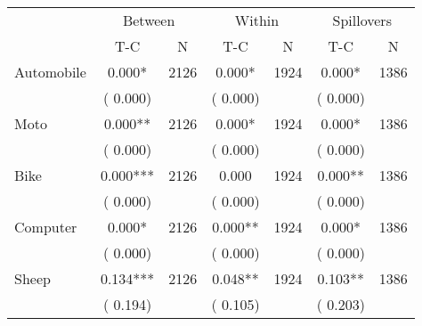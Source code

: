 
\begin{tabular}{l*{6}{c}}\hline&\multicolumn{2}{c}{Between}&\multicolumn{2}{c}{Within}&\multicolumn{2}{c}{Spillovers} \\ \cmidrule(r){2-3}\cmidrule(l){4-5}\cmidrule(l){6-7} & {T-C} & {N} & {T-C} & {N}  & {T-C}  & {N}  \\ \midrule
Automobile        &              0.000*      &       2126       &              0.000*      &       1924       &              0.000*      &       1386       \\
                       &       (       0.000)            &                               &       (       0.000)            &                               &       (       0.000)            &                               \\
Moto        &              0.000**      &       2126       &              0.000*      &       1924       &              0.000*      &       1386       \\
                       &       (       0.000)            &                               &       (       0.000)            &                               &       (       0.000)            &                               \\
Bike        &              0.000***      &       2126       &              0.000      &       1924       &              0.000**      &       1386       \\
                       &       (       0.000)            &                               &       (       0.000)            &                               &       (       0.000)            &                               \\
Computer        &              0.000*      &       2126       &              0.000**      &       1924       &              0.000*      &       1386       \\
                       &       (       0.000)            &                               &       (       0.000)            &                               &       (       0.000)            &                               \\
Sheep        &              0.134***      &       2126       &              0.048**      &       1924       &              0.103**      &       1386       \\
                       &       (       0.194)            &                               &       (       0.105)            &                               &       (       0.203)            &                               \\

\end{tabular}
